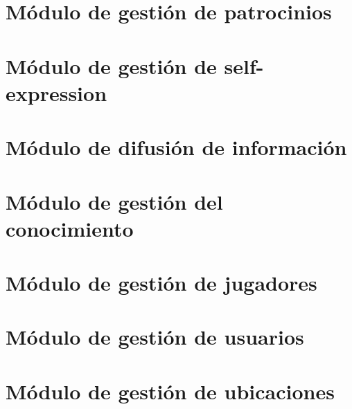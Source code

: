 \section{Módulo de gestión de patrocinios}


\section{Módulo de gestión de self-expression}


\section{Módulo de difusión de información}


\section{Módulo de gestión del conocimiento}


\section{Módulo de gestión de jugadores}


\section{Módulo de gestión de usuarios}


\section{Módulo de gestión de ubicaciones}

